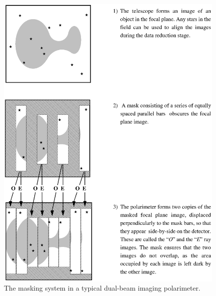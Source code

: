 \begin{latexonly}
  \begin{figure}[p]
  \begin{center}
  \includegraphics[scale=0.8]{sun223_figures/grids.eps}
  \caption{The masking system in a typical dual-beam imaging polarimeter.}
  \label{fig:grids}
  \end{center}
  \end{figure}
\end{latexonly}
